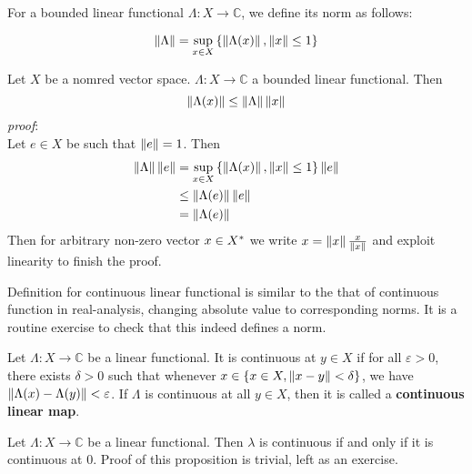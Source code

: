 \begin{definition}\rm\nextline
	For a bounded linear functional $\Lambda:X\xrightarrow{}\mathbb{C}$, we define its norm as follows:

	$$
		\left\|{\Lambda}\right\|=\sup_{x\in X}{\left\{\left\|{\Lambda(x)}\right\|,\left\|{x}\right\|\leq1\right\}}
	$$
\end{definition}

\begin{proposition}\rm\nextline
	Let $X$ be a nomred vector space. $\Lambda:X\xrightarrow{}\mathbb{C}$ a bounded linear functional.
	Then
	$$
		\left\|{\Lambda(x)}\right\|\leq\left\|{\Lambda}\right\|\left\|{x}\right\|
	$$
	\textit{proof}:\\
	Let $e\in X$ be such that $\left\|{e}\right\|=1$.
	Then
	\begin{equation}
		\begin{split}
			\left\|{\Lambda}\right\|\left\|{e}\right\|&=\sup_{x\in X}{\left\{\left\|{\Lambda(x)}\right\|,\left\|{x}\right\|\leq1\right\}}\left\|{e}\right\|\\
			&\leq \left\|{\Lambda(e)}\right\|\left\|{e}\right\|\\
			&=\left\|{\Lambda(e)}\right\|
		\end{split}
	\end{equation}
	Then for arbitrary non-zero vector $x\in{X}^*$ we write $x=\left\|{x}\right\|\frac{x}{\left\|{x}\right\|}$ and exploit linearity to finish the proof.
\end{proposition}
Definition for continuous linear functional is similar to the that of continuous function in real-analysis, changing absolute value to corresponding norms. It is a routine exercise to check that this indeed defines a norm.

\begin{definition}\rm\nextline
	Let $\Lambda:X\xrightarrow{}\mathbb{C}$ be a linear functional. It is continuous at $y\in X$ if for all $\varepsilon>0$, there exists $\delta>0$ such that whenever $x\in\{x\in X, \left\|{x-y}\right\|<\delta\}$, we have $\left\|{\Lambda(x)-\Lambda(y)}\right\|<\varepsilon$. If $\Lambda$ is continuous at all $y\in X$, then it is called a {\bf continuous linear map}.


\end{definition}

\begin{proposition}\rm\nextline
	Let $\Lambda:X\xrightarrow{}\mathbb{C}$ be a linear functional. Then $\lambda$ is continuous if and only if it is continuous at 0. Proof of this proposition is trivial, left as an exercise.

\end{proposition}

